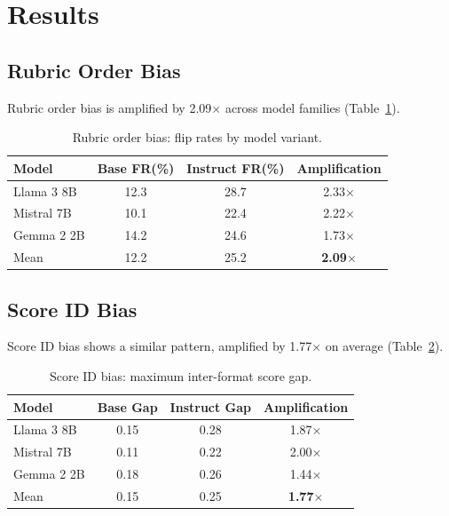 \documentclass[11pt,twocolumn]{article}
\begin{document}
\section{Results}

\subsection{Rubric Order Bias}

Rubric order bias is amplified by 2.09$\times$ across model families (Table~\ref{tab:rubric_results}).

\begin{table}[h]
\centering
\caption{Rubric order bias: flip rates by model variant.}
\label{tab:rubric_results}
\begin{tabular}{lccc}
\toprule
Model & Base FR(\%) & Instruct FR(\%) & Amplification \\
\midrule
Llama 3 8B & 12.3 & 28.7 & 2.33$\times$ \\
Mistral 7B & 10.1 & 22.4 & 2.22$\times$ \\
Gemma 2 2B & 14.2 & 24.6 & 1.73$\times$ \\
\midrule
Mean & 12.2 & 25.2 & \textbf{2.09$\times$} \\
\bottomrule
\end{tabular}
\end{table}

\subsection{Score ID Bias}

Score ID bias shows a similar pattern, amplified by 1.77$\times$ on average (Table~\ref{tab:scoreid_results}).

\begin{table}[h]
\centering
\caption{Score ID bias: maximum inter-format score gap.}
\label{tab:scoreid_results}
\begin{tabular}{lccc}
\toprule
Model & Base Gap & Instruct Gap & Amplification \\
\midrule
Llama 3 8B & 0.15 & 0.28 & 1.87$\times$ \\
Mistral 7B & 0.11 & 0.22 & 2.00$\times$ \\
Gemma 2 2B & 0.18 & 0.26 & 1.44$\times$ \\
\midrule
Mean & 0.15 & 0.25 & \textbf{1.77$\times$} \\
\bottomrule
\end{tabular}
\end{table}
\end{document}
